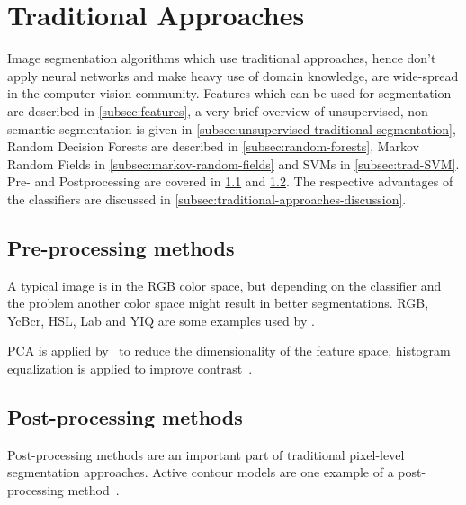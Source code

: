 
\newcommand\independent{\protect\mathpalette{\protect\independenT}{\perp}}
\def\independenT#1#2{\mathrel{\rlap{$#1#2$}\mkern2mu{#1#2}}}

\section{Traditional Approaches}\label{sec:traditional-approaches}%
Image segmentation algorithms which use traditional approaches, hence don't
apply neural networks and make heavy use of domain knowledge, are wide-spread
in the computer vision community. Features which can be used for segmentation
are described in \cref{subsec:features}, a very brief overview of unsupervised,
non-semantic segmentation is given in
\cref{subsec:unsupervised-traditional-segmentation}, Random Decision
Forests are described in \cref{subsec:random-forests}, Markov Random Fields in
\cref{subsec:markov-random-fields} and \glspl{SVM} in
\cref{subsec:trad-SVM}.
Pre- and Postprocessing are covered in \cref{subsec:preprocessing-methods} and
\cref{subsec:post-processing-methods}. The respective advantages of the
classifiers are discussed in \cref{subsec:traditional-approaches-discussion}.








\subsection{Pre-processing methods}\label{subsec:preprocessing-methods}%
A typical image is in the RGB color space, but depending on the classifier
and the problem another color space might result in better segmentations. RGB,
YcBcr, HSL, Lab and YIQ are some examples used by \cite{cohen2015memory}.

\Gls{PCA} is applied by~\cite{chen2011pixel} to reduce the dimensionality of
the feature space, histogram equalization is applied to improve
contrast~\cite{pizer1987adaptive,4228537}.


\subsection{Post-processing methods}\label{subsec:post-processing-methods}%
Post-processing methods are an important part of traditional pixel-level
segmentation approaches. Active contour models are one example of a
post-processing method~\cite{kass1988snakes}.

